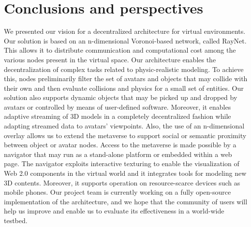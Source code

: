 \section{Conclusions and perspectives}
\label{sec:ending}
We  presented our vision for a decentralized architecture for
virtual environments.  Our solution is based on an n-dimensional
Voronoi-based \ptp network, called RayNet. This allows it to
distribute communication and computational cost among the various
nodes present in the virtual space. Our architecture enables the
decentralization of complex tasks related to physic-realistic
modeling. To achieve this, nodes preliminarily filter the set of
avatars and objects that may collide with their own and then evaluate
collisions and physics for a small set of entities. Our solution also
supports dynamic objects that may be picked up and dropped by avatars
or controlled by means of user-defined software.  Moreover, it enables
adaptive streaming of 3D models in a completely decentralized fashion
while adapting streamed data to avatars' viewpoints.  Also, the use
of an n-dimensional overlay allows us to extend the metaverse to
support social or semantic proximity between object or avatar nodes.
Access to the metaverse is made possible by a navigator that may run
as a stand-alone platform or embedded within a web page.  The
navigator exploits interactive texturing to enable the visualization
of Web 2.0 components in the virtual world and it integrates tools for
modeling new 3D contents. Moreover, it supports operation on
resource-scarce devices such as mobile phones. Our project team is
currently working on a fully open-source implementation of the \sol
architecture, and we hope that the community of users will help us
improve \sol and enable us to evaluate its effectiveness
in a world-wide testbed.
       


